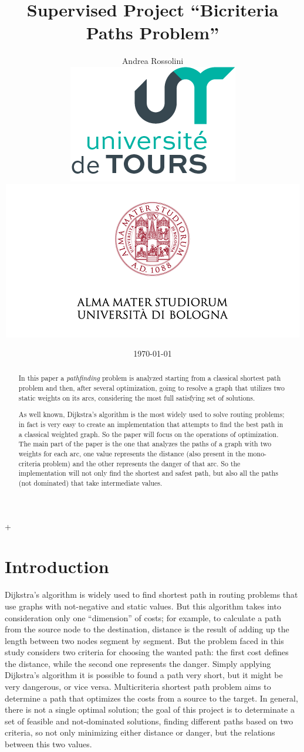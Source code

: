 \documentclass[a4paper,11pt]{report}
\title{Supervised Project ``Bicriteria Paths Problem''
\\
	}
\author{Andrea Rossolini\\
	\includegraphics[scale=0.9]{img/univToursLogo.png}
	\includegraphics[scale=0.6, trim= 0 8mm 0 0, clip]{img/uniboLogo.png}}
\date{\today}
\begin{document}
 
\maketitle+

\begin{abstract}
In this paper a \textit{pathfinding} problem is analyzed starting from a classical shortest path problem and then, after several optimization, going to resolve a graph that utilizes two static weights on its arcs, considering the most full satisfying set of solutions.

As well known, Dijkstra's algorithm is the most widely used to solve routing problems; in fact is very easy to create an implementation that attempts to find the best path in a classical weighted graph. So the paper will focus on the operations of optimization.
%
The main part of the paper is the one that analyzes the paths of a graph with two weights for each arc, one value represents the distance (also present in the mono-criteria problem) and the other represents the danger of that arc. So the implementation will not only find the shortest and safest path, but also all the paths (not dominated) that take intermediate values.
\end{abstract}

\tableofcontents

\chapter{Introduction}
Dijkstra's algorithm is widely used to find shortest path in routing problems that use graphs with not-negative and static values. But this algorithm takes into consideration only one ``dimension'' of costs; for example, to calculate a path from the source node to the destination, distance is the result of adding up the length between two nodes segment by segment.
%
But the problem faced in this study considers two criteria for choosing the wanted path: the first cost defines the distance, while the second one represents the danger. Simply applying Dijkstra's algorithm it is possible to found a path very short, but it might be very dangerous, or vice versa. Multicriteria shortest path problem aims to determine a path that optimizes the costs from a source to the target. In general, there is not a single optimal solution; the goal of this project is to determinate a set of feasible and not-dominated solutions, finding different paths based on two criteria, so not only minimizing either distance or danger, but the relations between this two values.
\vspace{5mm}
\end{document}
